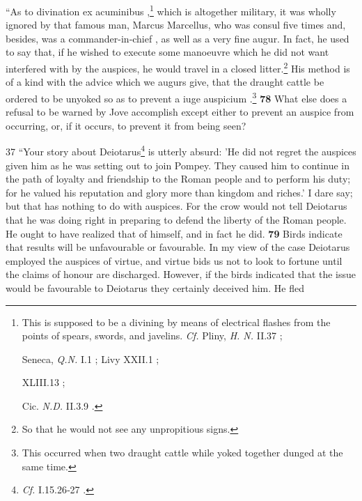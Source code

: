 ``As to divination ex acuminibus ,\texthebrew{}\footnote{This is supposed to be a divining by means of electrical flashes from the points of spears, swords, and javelins. \emph{Cf.}
Pliny, \emph{H. N.} II.37 ;

Seneca, \emph{Q.N.} I.1 ; Livy XXII.1 ;

XLIII.13 ;

Cic. \emph{N.D.} II.3.9 .

} which is altogether military, it was wholly ignored by that famous man, Marcus Marcellus, who was consul five times and, besides, was a commander-in\texthebrew{‑}chief , as well as a very fine augur. In fact, he used to say that, if he wished to execute some manoeuvre which he did not want interfered with by the auspices, he would travel in a closed litter.\texthebrew{}\footnote{So that he would not see any unpropitious signs.

} His method is of a kind with the advice which we augurs give, that the draught cattle be ordered to be unyoked so as to prevent a iuge auspicium .\texthebrew{}\footnote{This occurred when two draught cattle while yoked together dunged at the same time.

} \textbf{78} What else does a refusal to be warned by Jove accomplish except either to prevent an auspice from occurring, or, if it occurs, to prevent it from being seen?

37
``Your story about Deiotarus\texthebrew{}\footnote{\emph{Cf.}
I.15.26\texthebrew{‑}27 .

} is utterly absurd: 'He did not regret the auspices given him as he was setting out to join Pompey. They caused him to continue in the path of loyalty and friendship to the Roman people and to perform his duty; for he valued his reputation and glory more than kingdom and riches.' I dare say; but that has nothing to do with auspices. For the crow would not tell Deiotarus that he was doing right in preparing to defend the liberty of the Roman people. He ought to have realized that of himself, and in fact he did. \textbf{79} Birds indicate that results will be unfavourable or favourable. In my view of the case Deiotarus employed the auspices of virtue, and virtue bids us not to look to fortune until the claims of honour are discharged. However, if the birds indicated that the issue would be favourable to Deiotarus they certainly deceived him. He fled


